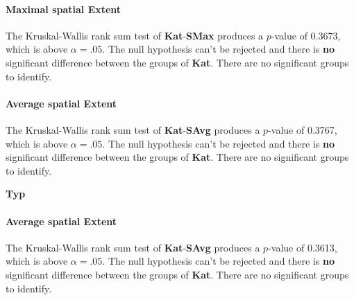 \paragraph{Maximal spatial Extent}
The Kruskal-Wallis rank sum test of \textbf{Kat}-\textbf{SMax} produces a $p$-value of 0.3673, which is above $\alpha=.05$. The null hypothesis can't be rejected and there is \textbf{no} significant difference between the groups of \textbf{Kat}. There are no significant groups to identify.

\paragraph{Average spatial Extent}
The Kruskal-Wallis rank sum test of \textbf{Kat}-\textbf{SAvg} produces a $p$-value of 0.3767, which is above $\alpha=.05$. The null hypothesis can't be rejected and there is \textbf{no} significant difference between the groups of \textbf{Kat}. There are no significant groups to identify.

\Large
\centerline{\textbf{Typ}}
\normalsize

\paragraph{Average spatial Extent}
The Kruskal-Wallis rank sum test of \textbf{Kat}-\textbf{SAvg} produces a $p$-value of 0.3613, which is above $\alpha=.05$. The null hypothesis can't be rejected and there is \textbf{no} significant difference between the groups of \textbf{Kat}. There are no significant groups to identify.


